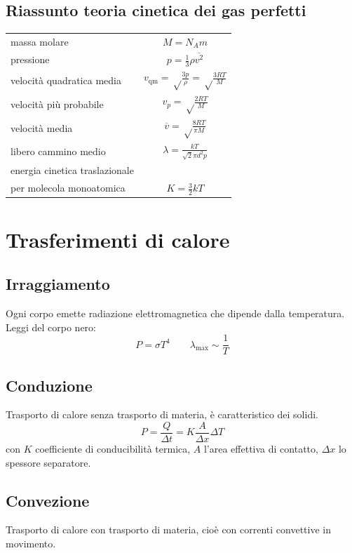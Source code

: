 \subsection{Riassunto teoria cinetica dei gas perfetti}
\begin{tabular}{lc}
massa molare&$M=N_A m$\\
pressione&$p=\frac{1}{3}\rho\overline{v^2}$\\
velocità quadratica media&$v_\text{qm}=\sqrt\frac{3p}{\rho}=\sqrt\frac{3RT}{M}$\\
velocità più probabile&$v_p=\sqrt\frac{2RT}{M}$\\
velocità media&$\overline{v}=\sqrt\frac{8RT}{\pi M}$\\
libero cammino medio&$\lambda=\frac{kT}{\sqrt{2}\pi d^2p}$\\
energia cinetica traslazionale \\per molecola monoatomica&$K=\frac{3}{2}kT$\\
\end{tabular}



\section{Trasferimenti di calore}
\subsection{Irraggiamento}
Ogni corpo emette radiazione elettromagnetica che dipende dalla temperatura. Leggi del corpo nero:
\begin{equation}P=\sigma T^4\qquad \lambda_\text{max}\sim\frac{1}{T}\end{equation}

\subsection{Conduzione}
Trasporto di calore senza trasporto di materia, è caratteristico dei solidi.
\begin{equation}
P=\frac{Q}{\Delta t}=K\frac{A}{\Delta x}\Delta T
\end{equation}
con $K$ coefficiente di conducibilità termica, $A$ l'area effettiva di contatto, $\Delta x$ lo spessore separatore.

\subsection{Convezione}
Trasporto di calore con trasporto di materia, cioè con correnti convettive in movimento.



